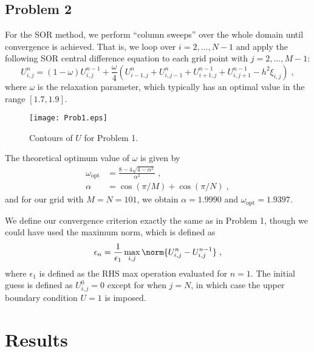 \documentclass[11pt]{article}
\begin{document}
\subsection{Problem 2}

For the SOR method, we perform ``column sweeps'' over the whole domain until convergence is achieved. That is, we loop over $i = 2, ..., N-1$ and apply the following SOR central difference equation to each grid point with $j = 2, ..., M-1$:
\begin{equation}
U_{i,j}^{n}
=
\left( 1 - \omega \right) U_{i,j}^{n-1}
+ \frac{\omega}{4}
\left(
  U_{i-1,j}^{n}
+ U_{i,j-1}^{n}
+ U_{i+1,j}^{n-1}
+ U_{i,j+1}^{n-1}
- h^2 \xi_{i,j}
\right)
\;,
\end{equation}
where $\omega$ is the relaxation parameter, which typically has an optimal value in the range $[1.7,1.9]$.

\begin{wrapfigure}[15]{R}{0.5\textwidth}
\begin{center}
\texttt{[image: Prob1.eps]}
\\[0.5cm]
\caption{Contours of $U$ for Problem 1.}
\label{fig:Prob1}
\end{center}
\end{wrapfigure}

The theoretical optimum value of $\omega$ is given by
\begin{align}
\omega_\text{opt} &= \frac{8 - 4 \sqrt{4 - \alpha^2}}{\alpha^2}
\;,\\
\alpha &= \cos(\pi/M) + \cos(\pi/N)
\;,
\end{align}
and for our grid with $M=N=101$, we obtain $\alpha = 1.9990$ and $\omega_\text{opt} = 1.9397$.

We define our convergence criterion exactly the same as in Problem 1, though we could have used the maximum norm, which is defined as
\begin{equation}
\epsilon_n = \frac{1}{\epsilon_1} \max_{i,j} \norm{U_{i,j}^{n} - U_{i,j}^{n-1}}
\;,
\end{equation}
where $\epsilon_1$ is defined as the RHS max operation evaluated for $n=1$. The initial guess is defined as $U_{i,j}^0 = 0$ except for when $j=N$, in which case the upper boundary condition $U=1$ is imposed.

\section{Results} %
\end{document}
